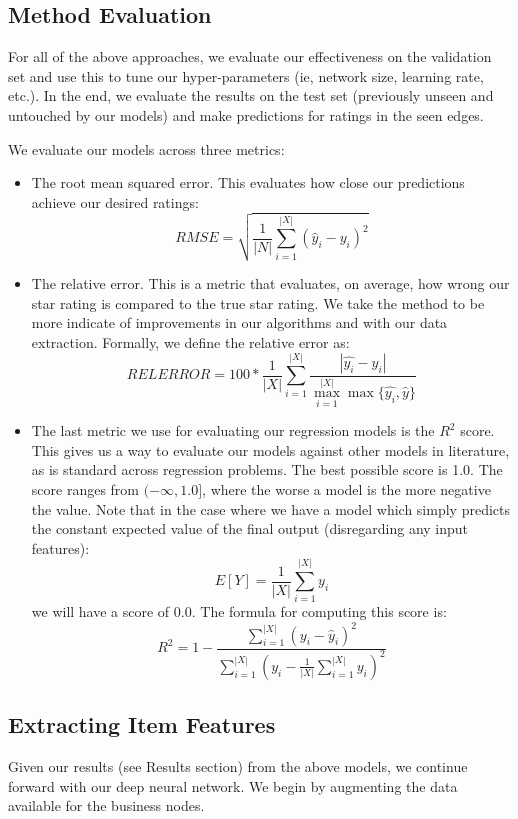 \documentclass[letterpaper, 10 pt, conference]{ieeeconf}  %
\begin{document}
\subsection{Method Evaluation}

For all of the above approaches, we evaluate our effectiveness on the validation set and use this to tune our hyper-parameters (ie, network size, learning rate, etc.). In the end, we evaluate the results on the test set (previously unseen and untouched by our models) and make predictions for ratings in the seen edges. 

We evaluate our models across three metrics:

\begin{itemize}
\item The root mean squared error. This evaluates how close our predictions achieve our desired ratings:
$$
RMSE = \sqrt{\frac{1}{|N|}\sum_{i = 1}^{|X|} (\hat{y}_i - y_i)^2}
$$
\item The relative error. This is a metric that evaluates, on average, how wrong our star rating is compared to the true star rating. We take the method to be more indicate of improvements in our algorithms and with our data extraction. Formally, we define the relative error as:
$$
RELERROR = 100*\frac{1}{|X|}\sum_{i=1}^{|X|} \frac{|\hat{y_i} - y_i|}{\max_{i=1}^{|X|} \max\{\hat{y_i}, \hat{y}\}}
$$
\item The last metric we use for evaluating our regression models is the $R^2$ score. This gives us a way to evaluate our models against other models in literature, as is standard across regression problems. The best possible score is 1.0. The score ranges from $(-\infty, 1.0]$, where the worse a model is the more negative the value. Note that in the case where we have a model which simply predicts the constant expected value of the final output (disregarding any input features):
$$
E[Y] = \frac{1}{|X|}\sum_{i=1}^{|X|} y_{i}
$$
we will have a score of $0.0$. The formula for computing this score is:
$$
R^2 = 1 - \frac{\sum_{i=1}^{|X|}(y_i - \hat{y}_i)^2}{\sum_{i=1}^{|X|} \left(y_i - \frac{1}{|X|}\sum_{i=1}^{|X|}y_i\right)^2}
$$

\end{itemize}

\subsection{Extracting Item Features}

Given our results (see Results section) from the above models, we continue forward with our deep neural network. We begin by augmenting the data available for the business nodes. 
\end{document}
